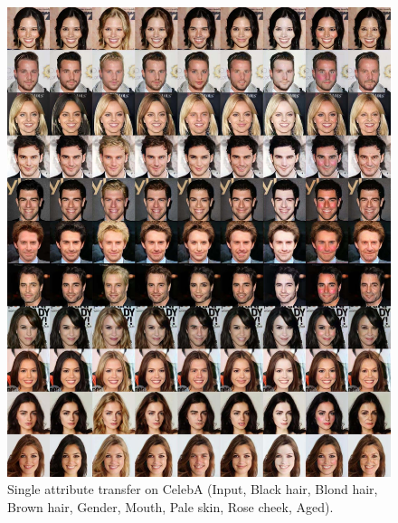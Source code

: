 \documentclass[10pt,twocolumn,letterpaper]{article}
\begin{document}
\begin{figure}[h]
\centering
\centerline{\includegraphics[width=1.0\linewidth]{images/supple_CelebA_attr_8-min.jpg}}
\caption{Single attribute transfer on CelebA (Input, Black hair, Blond hair, Brown hair, Gender, Mouth, Pale skin, Rose cheek, Aged).}
\label{figure10}
\end{figure}
\end{document}
